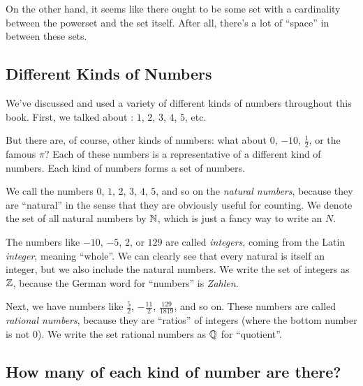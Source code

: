 On the other hand, it seems like there ought to be some set with a cardinality between the powerset and the set itself.
After all, there's a lot of ``space'' in between these sets. 

\subsection{Different Kinds of Numbers}

We've discussed and used a variety of different kinds of numbers throughout this book.
First, we talked about : $1$, $2$, $3$, $4$, $5$, etc.

But there are, of course, other kinds of numbers: what about $0$, $-10$, $\frac{1}{2}$, or the famous $\pi$?
Each of these numbers is a representative of a different kind of numbers.
Each kind of numbers forms a set of numbers.

We call the numbers $0$, $1$, $2$, $3$, $4$, $5$, and so on the \emph{natural numbers}, because they are ``natural'' in the sense that they are obviously useful for counting.
We denote the set of all natural numbers by $\mathbb{N}$, which is just a fancy way to write an $N$.

The numbers like $-10$, $-5$, $2$, or $129$ are called \emph{integers}, coming from the Latin \emph{integer}, meaning ``whole''.
We can clearly see that every natural is itself an integer, but we also include the natural numbers.
We write the set of integers as $\mathbb{Z}$, because the German word for ``numbers'' is \emph{Zahlen}.

Next, we have numbers like $\frac{5}{2}$, $-\frac{11}{2}$, $\frac{129}{1819}$, and so on.
These numbers are called \emph{rational numbers}, because they are ``ratios'' of integers (where the bottom number is not $0$).
We write the set rational numbers as $\mathbb{Q}$ for ``quotient''.

\subsection{How many of each kind of number are there?}

